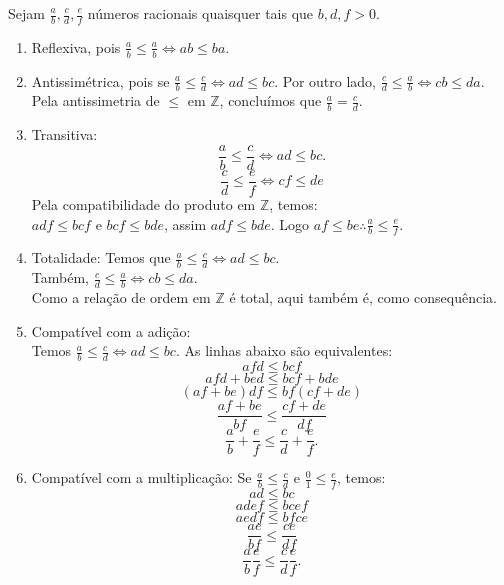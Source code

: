 \documentclass[../main.tex]{subfiles}
\begin{document}
\begin{dem}
    Sejam $\frac{a}{b}, \frac{c}{d}, \frac{e}{f}$ números racionais quaisquer tais que $b,d,f > 0$.
    \begin{enumerate}[label=(\roman*)]
        \item Reflexiva, pois $\frac{a}{b} \leq \frac{a}{b} \iff ab \leq ba$.
        \item Antissimétrica, pois se $\frac{a}{b} \leq \frac{c}{d} \iff ad \leq bc$. Por outro lado, $\frac{c}{d} \leq \frac{a}{b} \iff cb \leq da$. Pela antissimetria de $\leq$ em $\mathbb{Z}$, concluímos que $\frac{a}{b} = \frac{c}{d}$.
        \item Transitiva: \\
        \[ \frac{a}{b} \leq \frac{c}{d} \iff ad \leq bc. \]
        \[ \frac{c}{d} \leq \frac{e}{f} \iff cf \leq de \]
        Pela compatibilidade do produto em $\mathbb{Z}$, temos: \\
        $adf \leq bcf$ e $bcf \leq bde$, assim $adf \leq bde$.
        Logo $af \leq be \therefore \frac{a}{b} \leq \frac{e}{f}$.
        
        \item Totalidade:
        Temos que $\frac{a}{b} \leq \frac{c}{d} \iff ad \leq bc$. \\
        Também, $\frac{c}{d} \leq \frac{a}{b} \iff cb \leq da$. \\
        Como a relação de ordem em $\mathbb{Z}$ é total, aqui também é, como consequência.
        
        \item Compatível com a adição: \\
        Temos $\frac{a}{b} \leq \frac{c}{d} \iff ad \leq bc$. As linhas abaixo são equivalentes: \\
        \[ afd \leq bcf \]
        \[ afd + bed \leq bcf + bde \]   
        \[ (af+be)df \leq bf(cf+de) \]
        \[ \frac{af+be}{bf} \leq \frac{cf+de}{df} \]
        \[ \frac{a}{b} + \frac{e}{f} \leq \frac{c}{d} + \frac{e}{f}. \]
        
        \item Compatível com a multiplicação:
        Se $\frac{a}{b} \leq \frac{c}{d}$ e $\frac{0}{1} \leq \frac{e}{f}$, temos: \\
        
            \[ ad \leq bc \]
            \[adef \leq bcef \] 
            \[ aedf \leq bfce \]
            \[\frac{ae}{bf} \leq \frac{ce}{df} \] 
            \[\frac{a}{b} \frac{e}{f} \leq \frac{c}{d} \frac{e}{f}. \]                   
    \end{enumerate}
\end{dem}
\end{document}
